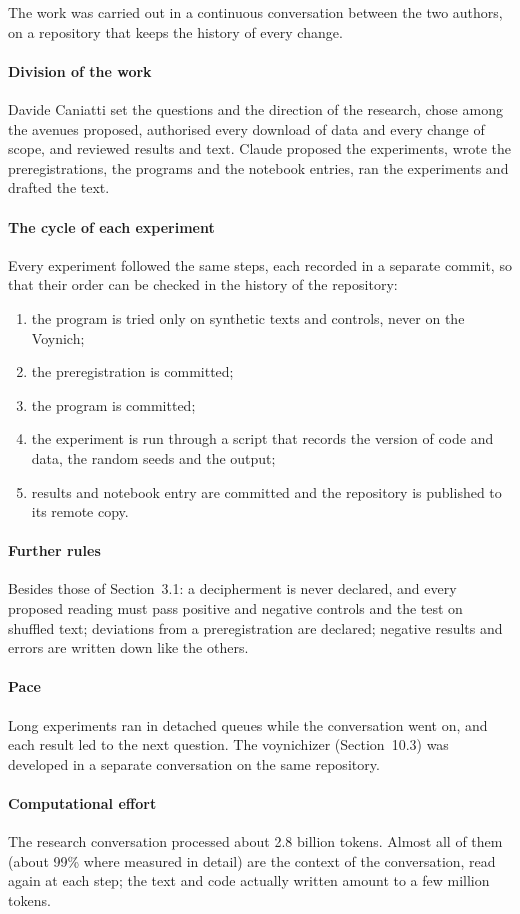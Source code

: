The work was carried out in a continuous conversation between the two authors, on a repository that keeps the history of
every change.

\paragraph{Division of the work} Davide Caniatti set the questions and the direction of the research, chose among the
avenues proposed, authorised every download of data and every change of scope, and reviewed results and text. Claude
proposed the experiments, wrote the preregistrations, the programs and the notebook entries, ran the experiments and
drafted the text.

\paragraph{The cycle of each experiment} Every experiment followed the same steps, each recorded in a separate commit, so
that their order can be checked in the history of the repository:
\begin{enumerate}
\item the program is tried only on synthetic texts and controls, never on the Voynich;
\item the preregistration is committed;
\item the program is committed;
\item the experiment is run through a script that records the version of code and data, the random seeds and the output;
\item results and notebook entry are committed and the repository is published to its remote copy.
\end{enumerate}

\paragraph{Further rules} Besides those of Section~3.1: a decipherment is never declared, and every proposed reading
must pass positive and negative controls and the test on shuffled text; deviations from a preregistration are declared;
negative results and errors are written down like the others.

\paragraph{Pace} Long experiments ran in detached queues while the conversation went on, and each result led to the
next question. The voynichizer (Section~10.3) was developed in a separate conversation on the same repository.

\paragraph{Computational effort} The research conversation processed about 2.8 billion tokens. Almost all of them (about
99\% where measured in detail) are the context of the conversation, read again at each step; the text and code actually
written amount to a few million tokens.
